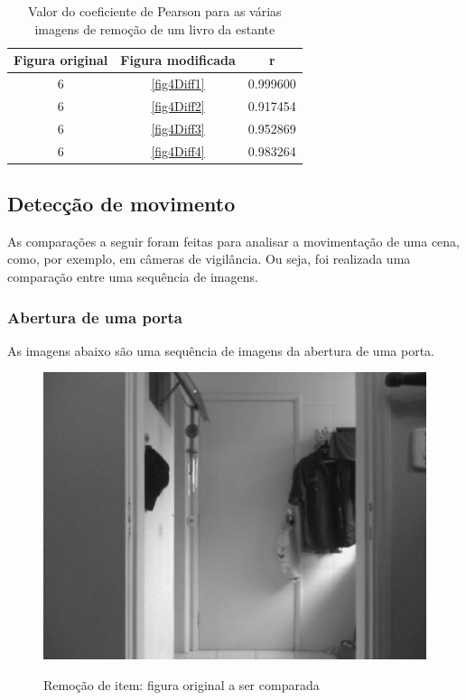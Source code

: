 \documentclass[10pt,a4paper]{article}
\begin{document}
\vspace{-1.0cm}
\begin{table}[h!]
  \begin{center}
    \caption{Valor do coeficiente de Pearson para as várias imagens de
      remoção de um livro da estante}
    \begin{tabular}{|c|c|c|}
      \hline
      Figura original & Figura modificada & r\\
      \hline
      6 &  \ref{fig4Diff1} & 0.999600\\
      6 &  \ref{fig4Diff2} &  0.917454\\
      6 &  \ref{fig4Diff3} &   0.952869\\
      6 &  \ref{fig4Diff4} &   0.983264\\
      \hline
    \end{tabular}\label{tab:livro}
  \end{center}
\end{table}


\newpage
\subsection{Detecção de movimento}
As comparações a seguir foram feitas para analisar a movimentação de uma cena, como, por exemplo, em câmeras de
vigilância. Ou seja, foi realizada uma comparação entre uma sequência de imagens.

\subsubsection{Abertura de uma porta}
As imagens abaixo são uma sequência de imagens da
abertura de uma porta.

\begin{figure}[h!]
  \begin{center}
    \includegraphics[scale=0.35]{photos/porta/gBase} \label{porta}
    \caption{Remoção de item: figura original a ser comparada}
  \end{center}
\end{figure}
\end{document}
